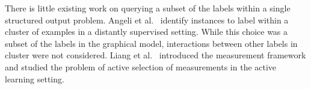 There is little existing work on querying a subset of the labels within a single structured output problem.
Angeli et al.~\cite{angeli2014combining} identify instances to label within a cluster of examples in a distantly supervised setting. While this choice was a subset of the labels in the graphical model, interactions between other labels in cluster were not considered.
Liang et al.~\cite{liang09measurements} introduced the measurement framework and studied the problem of active selection of measurements in the active learning setting. 







%

